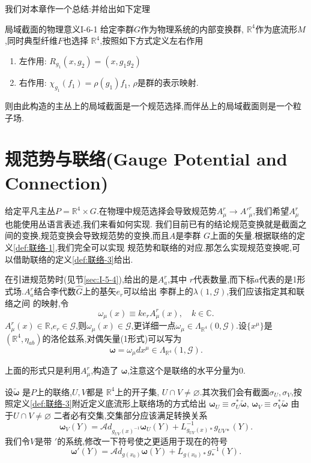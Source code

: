 \documentclass[../main.tex]{subfiles}
\begin{document}
我们对本章作一个总结:并给出如下定理
 \begin{theorem}
   {局域截面的物理意义}{I-6-1}
   给定李群$G$作为物理系统的内部变换群, $\mathbb{R}^4$作为底流形$M$,同时典型纤维$F$也选择 $\mathbb{R}^4$,按照如下方式定义左右作用
   \begin{enumerate}
     \item 左作用: $R_{g_1}(x,g_2) = (x,g_1g_2)$
     \item 右作用: $\chi_{g_1}(f_1) = \rho(g_1)f_1$, $\rho$是群的表示映射.
   \end{enumerate}
   则由此构造的主丛上的局域截面是一个规范选择,而伴丛上的局域截面则是一个粒子场.
\end{theorem}
\chapter{规范势与联络(Gauge Potential and Connection)}
给定平凡主丛$P = \mathbb{R}^4 \times G$.在物理中规范选择会导致规范势$A^r_\mu \to A'^r_\mu$,我们希望$A^r_\mu$也能使用丛语言表述,我们来看如何实现.
我们目前已有的结论规范变换就是截面之间的变换,规范变换会导致规范势的变换,而且$A$是李群 $G$上面的矢量.根据联络的定义\ref{def:联络-1},我们完全可以实现
规范势和联络的对应.那怎么实现规范变换呢,可以借助联络的定义\ref{def:联络-3}给出.

在引进规范势时(见节\ref{sec:I-5-4}),给出的是$A^r_a$,其中 $r$代表数量,而下标$a$代表的是1形式场.$A^r_a$结合李代数$\hat{G}$上的基矢$e_r$可以给出 李群上的$\lambda(1,\mathscr{G})$,我们应该指定其和联络之间
的映射,令\[
  \omega_\mu(x) \equiv ke_r A^r_\mu(x), \quad k\in\mathbb{C}
.\] 
$A^r_\mu(x) \in \mathbb{R}$,$e_r \in \mathscr{G}$,则$\omega_\mu(x) \in \mathscr{G}$,更详细一点$\omega_\mu \in \Lambda_{\mathbb{R}^4}(0,\mathscr{G})$.设$\{x^\mu\}$是 $(\mathbb{R}^4,\eta_{ab})$的洛伦兹系,对偶矢量(1形式)可以写为 
\begin{equation}
  \label{eq:I-7-1} 
  \bm{\omega} = \omega_\mu dx^\mu \in \Lambda_{\mathbb{R}^4}(1,\mathscr{G}).
\end{equation}
\begin{note}
  上面的形式只是利用$A^r_\mu$,构造了 $\bm{\omega} $,注意这个是联络的水平分量为0.
\end{note}
设$\tilde{\bm{\omega}}$ 是$P$上的联络,$U,V$都是 $\mathbb{R}^4$上的开子集, $U\cap V \neq \varnothing$.其次我们会有截面$\sigma_U,\sigma_V$,按照定义\ref{def:联络-3}附近定义底流形上联络场的方式给出 $\bm{\omega}_U \equiv \sigma^*_U \bm{\tilde{\omega}} $, $\bm{\omega}_V \equiv \sigma^*_V \bm{\tilde{\omega}}$ 由于$U\cap V \neq \varnothing$
二者必有交集,交集部分应该满足转换关系
\[
         \bm{\omega}_V(Y)= \mathscr{A}\!d_{g_{UV}(x)^{-1}}\bm{\omega}_U(Y) + L^{-1}_{g_{UV}(x)*}g_{UV*}(Y)
.\] 
我们令$V$是带 $'$的系统,修改一下符号使之更适用于现在的符号
\begin{equation}
  \label{eq:I-7-2}
  \bm{\omega}'(Y) = \mathscr{A}\!d_{g(x_0)}\bm{\omega}(Y)   + L_{g(x_0)*} g^{-1}_*(Y)
.
\end{equation}
\end{document}
